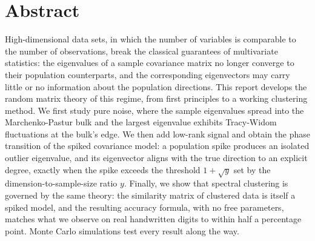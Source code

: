 
\section*{Abstract}

High-dimensional data sets, in which the number of variables is comparable to the number of observations, break the classical guarantees of multivariate statistics: the eigenvalues of a sample covariance matrix no longer converge to their population counterparts, and the corresponding eigenvectors may carry little or no information about the population directions. This report develops the random matrix theory of this regime, from first principles to a working clustering method. We first study pure noise, where the sample eigenvalues spread into the Marchenko-Pastur bulk and the largest eigenvalue exhibits Tracy-Widom fluctuations at the bulk's edge. We then add low-rank signal and obtain the phase transition of the spiked covariance model: a population spike produces an isolated outlier eigenvalue, and its eigenvector aligns with the true direction to an explicit degree, exactly when the spike exceeds the threshold \(1 + \sqrt{y}\) set by the dimension-to-sample-size ratio \(y\). Finally, we show that spectral clustering is governed by the same theory: the similarity matrix of clustered data is itself a spiked model, and the resulting accuracy formula, with no free parameters, matches what we observe on real handwritten digits to within half a percentage point. Monte Carlo simulations test every result along the way.

\vspace{0.45in}
